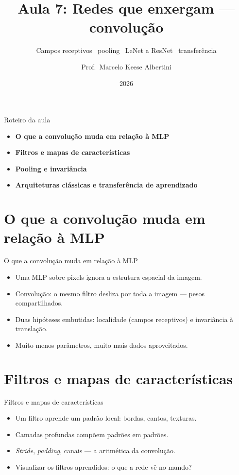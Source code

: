 \documentclass[aspectratio=169, 11pt]{beamer}
\title[Aula 7 — Convolução]{Aula 7: Redes que enxergam — convolução}
\subtitle[GBC073 — Inteligência Computacional]{Campos receptivos \textbullet\ pooling \textbullet\ LeNet a ResNet \textbullet\ transferência}
\author[Prof.\ Marcelo Albertini]{Prof.\ Marcelo Keese Albertini}
\institute{GBC073 — Inteligência Computacional \textbullet\ Universidade Federal de Uberlândia}
\date{2026}
\begin{document}
\begin{frame}
  \titlepage
\end{frame}

\begin{frame}{Roteiro da aula}
  \begin{itemize}\setlength{\itemsep}{0.5ex}
    \item<1-> \textbf{O que a convolução muda em relação à MLP}
    \item<2-> \textbf{Filtros e mapas de características}
    \item<3-> \textbf{Pooling e invariância}
    \item<4-> \textbf{Arquiteturas clássicas e transferência de aprendizado}
  \end{itemize}
\end{frame}

\section{O que a convolução muda em relação à MLP}

\begin{frame}{O que a convolução muda em relação à MLP}
  \begin{itemize}\setlength{\itemsep}{0.4ex}
    \item Uma MLP sobre pixels ignora a estrutura espacial da imagem.
    \item Convolução: o mesmo filtro desliza por toda a imagem — pesos
          compartilhados.
    \item Duas hipóteses embutidas: localidade (campos receptivos) e
          invariância à translação.
    \item Muito menos parâmetros, muito mais dados aproveitados.
  \end{itemize}
\end{frame}

\section{Filtros e mapas de características}

\begin{frame}{Filtros e mapas de características}
  \begin{itemize}\setlength{\itemsep}{0.4ex}
    \item Um filtro aprende um padrão local: bordas, cantos, texturas.
    \item Camadas profundas compõem padrões em padrões.
    \item \emph{Stride}, \emph{padding}, canais — a aritmética da convolução.
    \item Visualizar os filtros aprendidos: o que a rede vê no mundo?
  \end{itemize}
\end{frame}
\end{document}
